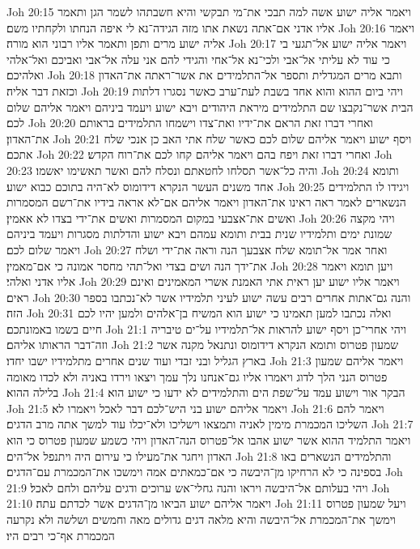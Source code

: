 Joh 20:15  ויאמר אליה ישוע אשה למה תבכי את־מי תבקשי והיא חשבתהו לשמר הגן ותאמר אליו אדני אם־אתה נשאת אתו מזה הגידה־נא לי איפה הנחתו ולקחתיו משם׃
Joh 20:16  ויאמר אליה ישוע מרים ותפן ותאמר אליו רבוני הוא מורה׃
Joh 20:17  ויאמר אליה ישוע אל־תגעי בי כי עוד לא עליתי אל־אבי ולכי־נא אל־אחי והגידי להם אני עלה אל־אבי ואביכם ואל־אלהי ואלהיכם׃
Joh 20:18  ותבא מרים המגדלית ותספר אל־התלמידים את אשר־ראתה את־האדון וכזאת דבר אליה׃
Joh 20:19  ויהי ביום ההוא והוא אחד בשבת לעת־ערב כאשר נסגרו דלתות הבית אשר־נקבצו שם התלמידים מיראת היהודים ויבא ישוע ויעמד ביניהם ויאמר אליהם שלום לכם׃
Joh 20:20  ואחרי דברו זאת הראם את־ידיו ואת־צדו וישמחו התלמידים בראותם את־האדון׃
Joh 20:21  ויסף ישוע ויאמר אליהם שלום לכם כאשר שלח אתי האב כן אנכי שלח אתכם׃
Joh 20:22  ואחרי דברו זאת ויפח בהם ויאמר אליהם קחו לכם את־רוח הקדש׃
Joh 20:23  והיה כל־אשר תסלחו לחטאתם ונסלח להם ואשר תאשימו יאשמו׃
Joh 20:24  ותומא אחד משנים העשר הנקרא דידומוס לא־היה בתוכם כבוא ישוע׃
Joh 20:25  ויגידו לו התלמידים הנשארים לאמר ראה ראינו את־האדון ויאמר אליהם אם־לא אראה בידיו את־רשם המסמרות ואשים את־אצבעי במקום המסמרות ואשים את־ידי בצדו לא אאמין׃
Joh 20:26  ויהי מקצה שמונת ימים ותלמידיו שנית בבית ותומא עמהם ויבא ישוע והדלתות מסגרות ויעמד ביניהם ויאמר שלום לכם׃
Joh 20:27  ואחר אמר אל־תומא שלח אצבעך הנה וראה את־ידי ושלח את־ידך הנה ושים בצדי ואל־תהי מחסר אמונה כי אם־מאמין׃
Joh 20:28  ויען תומא ויאמר אליו אדני ואלהי׃
Joh 20:29  ויאמר אליו ישוע יען ראית אתי האמנת אשרי המאמינים ואינם ראים׃
Joh 20:30  והנה גם־אתות אחרים רבים עשה ישוע לעיני תלמידיו אשר לא־נכתבו בספר הזה׃
Joh 20:31  ואלה נכתבו למען תאמינו כי ישוע הוא המשיח בן־אלהים ולמען יהיו לכם חיים בשמו באמונתכם׃
Joh 21:1  ויהי אחרי־כן ויסף ישוע להראות אל־תלמידיו על־ים טיבריה וזה־דבר הראותו אליהם׃
Joh 21:2  שמעון פטרוס ותומא הנקרא דידומוס ונתנאל מקנה אשר בארץ הגליל ובני זבדי ועוד שנים אחרים מתלמידיו ישבו יחדו׃
Joh 21:3  ויאמר אליהם שמעון פטרוס הנני הלך לדוג ויאמרו אליו גם־אנחנו נלך עמך ויצאו וירדו באניה ולא לכדו מאומה בלילה ההוא׃
Joh 21:4  הבקר אור וישוע עמד על־שפת הים והתלמידים לא ידעו כי ישוע הוא׃
Joh 21:5  ויאמר אליהם ישוע בני היש־לכם דבר לאכל ויאמרו לא׃
Joh 21:6  ויאמר להם השליכו המכמרת מימין לאניה ותמצאו וישליכו ולא־יכלו עוד למשך אתה מרב הדגים׃
Joh 21:7  ויאמר התלמיד ההוא אשר ישוע אהבו אל־פטרוס הנה־האדון ויהי כשמע שמעון פטרוס כי הוא האדון ויחגר את־מעילו כי עירום היה ויתנפל אל־הים׃
Joh 21:8  והתלמידים הנשארים באו בספינה כי לא הרחיקו מן־היבשה כי אם־כמאתים אמה וימשכו את־המכמרת עם־הדגים׃
Joh 21:9  ויהי בעלותם אל־היבשה ויראו והנה גחלי־אש ערוכים ודגים עליהם ולחם לאכל׃
Joh 21:10  ויאמר אליהם ישוע הביאו מן־הדגים אשר לכדתם עתה׃
Joh 21:11  ויעל שמעון פטרוס וימשך את־המכמרת אל־היבשה והיא מלאה דגים גדולים מאה וחמשים ושלשה ולא נקרעה המכמרת אף־כי רבים היו׃
